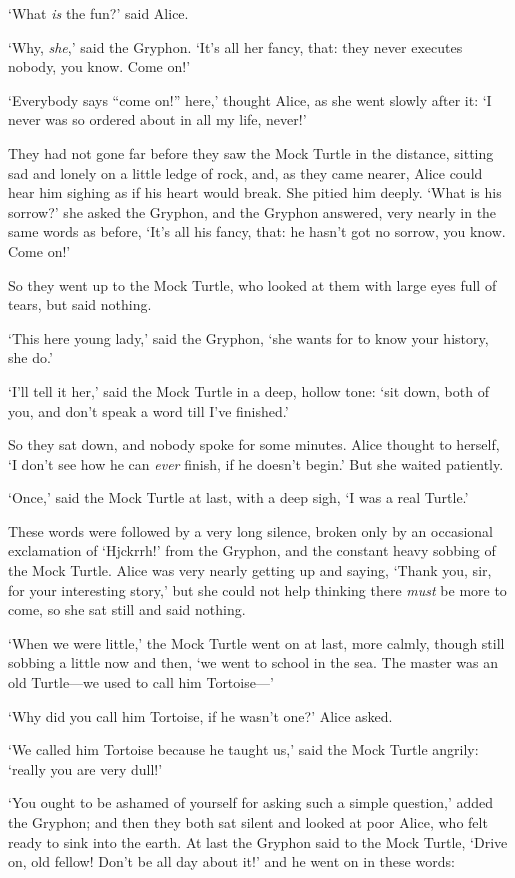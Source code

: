 \documentclass[12pt,openany]{memoir}
\begin{document}
`What \textit{is} the fun?' said Alice.

`Why, \textit{she},' said the Gryphon. `It's all her fancy, that: they never executes nobody, you know. Come on!'

`Everybody says ``come on!'' here,' thought Alice, as she went slowly after it: `I never was so ordered about in all my life, never!'

They had not gone far before they saw the Mock Turtle in the distance, sitting sad and lonely on a little ledge of rock, and, as they came nearer, Alice could hear him sighing as if his heart would break. She pitied him deeply. `What is his sorrow?' she asked the Gryphon, and the Gryphon answered, very nearly in the same words as before, `It's all his fancy, that: he hasn't got no sorrow, you know. Come on!'

So they went up to the Mock Turtle, who looked at them with large eyes full of tears, but said nothing.

`This here young lady,' said the Gryphon, `she wants for to know your history, she do.'

`I'll tell it her,' said the Mock Turtle in a deep, hollow tone: `sit down, both of you, and don't speak a word till I've finished.'

So they sat down, and nobody spoke for some minutes. Alice thought to herself, `I don't see how he can \textit{ever} finish, if he doesn't begin.' But she waited patiently.

`Once,' said the Mock Turtle at last, with a deep sigh, `I was a real Turtle.'

These words were followed by a very long silence, broken only by an occasional exclamation of `Hjckrrh!' from the Gryphon, and the constant heavy sobbing of the Mock Turtle. Alice was very nearly getting up and saying, `Thank you, sir, for your interesting story,' but she could not help thinking there \textit{must} be more to come, so she sat still and said nothing.

`When we were little,' the Mock Turtle went on at last, more calmly, though still sobbing a little now and then, `we went to school in the sea. The master was an old Turtle---we used to call him Tortoise---'

`Why did you call him Tortoise, if he wasn't one?' Alice asked.

`We called him Tortoise because he taught us,' said the Mock Turtle angrily: `really you are very dull!'

`You ought to be ashamed of yourself for asking such a simple question,' added the Gryphon; and then they both sat silent and looked at poor Alice, who felt ready to sink into the earth. At last the Gryphon said to the Mock Turtle, `Drive on, old fellow! Don't be all day about it!' and he went on in these words:
\end{document}
